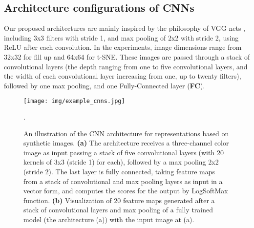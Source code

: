 \documentclass{article}
\begin{document}
\subsection{Architecture configurations of CNNs}
Our proposed architectures are mainly inspired by the philosophy of VGG nets \cite{VGGNet_2014}, including 3x3 filters with stride 1, and max pooling of 2x2 with stride 2, using ReLU after each convolution. In the experiments, image dimensions range from 32x32 for fill up and 64x64 for t-SNE. These images are passed through a stack of convolutional layers (the depth ranging from one to five convolutional layers, and the width of each convolutional layer increasing from one, up to twenty filters), followed by one max pooling, and one Fully-Connected layer (\textbf{FC}). 
\begin{figure}[ht]
\centering
\texttt{[image: img/example\_cnns.jpg]}
\caption{An illustration of the CNN architecture for representations based on synthetic images. \textbf{(a)} The architecture receives a three-channel color image as input passing a stack of five convolutional layers (with 20 kernels of 3x3 (stride 1) for each), followed by a max pooling 2x2 (stride 2). The last layer is fully connected, taking feature maps from a stack of convolutional and max pooling layers as input in a vector form, and computes the scores for the output by LogSoftMax function. \textbf{(b)} Visualization of 20 feature maps generated after a stack of convolutional layers and max pooling of a fully trained model (the architecture (a)) with the input image at (a).}.
\label{fig:example_cnns}
\end{figure}
\end{document}
